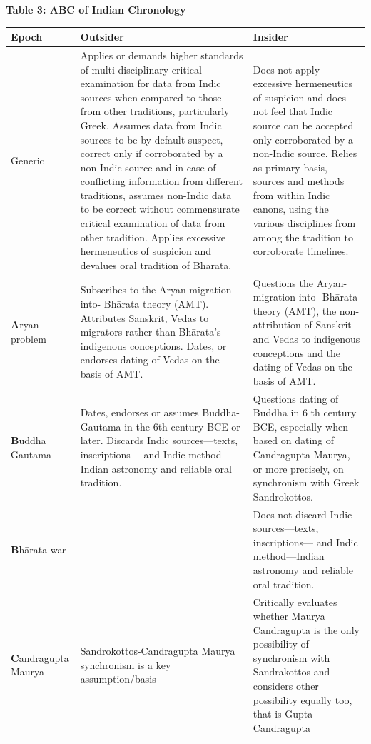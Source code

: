 \textbf{Table 3: ABC of Indian Chronology}

\begin{longtable}{|p{1.4cm}|p{3.6cm}|p{3.6cm}|}
\hline
Epoch & Outsider & Insider \\
\hline
Generic & Applies or demands higher standards of multi-disciplinary critical examination for data from Indic sources when compared to those from other traditions, particularly Greek. Assumes data from Indic sources to be by default suspect, correct only if corroborated by a non-Indic source and in case of conflicting information from different traditions, assumes non-Indic data to be correct without commensurate critical examination of data from other tradition. Applies excessive hermeneutics of suspicion and devalues oral tradition of Bhārata. & Does not apply excessive hermeneutics of suspicion and does not feel that Indic source can be accepted only corroborated by a non-Indic source. Relies as primary basis, sources and methods from within Indic canons, using the various disciplines from among the tradition to corroborate timelines. \\
\hline
\textbf{A}ryan problem & Subscribes to the Aryan-migration-into- Bhārata theory (AMT). Attributes Sanskrit, Vedas to migrators rather than Bhārata’s indigenous conceptions. Dates, or endorses dating of Vedas on the basis of AMT. & Questions the Aryan-migration-into- Bhārata theory (AMT), the non-attribution of Sanskrit and Vedas to indigenous conceptions and the dating of Vedas on the basis of AMT. \\
\hline
\textbf{B}uddha Gautama & Dates, endorses or assumes Buddha-Gautama in the 6th century BCE or later. Discards Indic sources—texts, inscriptions— and Indic method—Indian astronomy and reliable oral tradition. & Questions dating of Buddha in 6 th   century BCE, especially when based on dating of Candragupta Maurya, or more precisely, on synchronism with Greek Sandrokottos. \\
\hline
\textbf{B}hārata war &  & Does not discard Indic sources—texts, inscriptions— and Indic method—Indian astronomy and reliable oral tradition. \\
\hline
\textbf{C}andra\-gupta Maurya & Sandrokottos-Candragupta Maurya synchronism is a key assumption/basis & Critically evaluates whether Maurya Candragupta is the only possibility of synchronism with Sandrakottos and considers other possibility equally too, that is Gupta Candragupta \\
\hline
\end{longtable}



